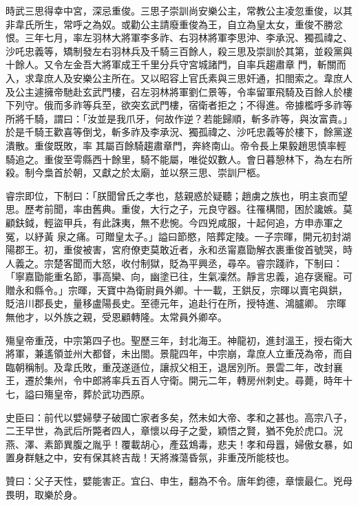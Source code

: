 \begin{pinyinscope}
 時武三思得幸中宮，深忌重俊。三思子崇訓尚安樂公主，常教公主凌忽重俊，以其非韋氏所生，常呼之為奴。或勸公主請廢重俊為王，自立為皇太女，重俊不勝忿恨。三年七月，率左羽林大將軍李多祚、右羽林將軍李思沖、李承況、獨孤禕之、沙吒忠義等，矯制發左右羽林兵及千騎三百餘人，殺三思及崇訓於其第，並殺黨與十餘人。又令左金吾大將軍成王千里分兵守宮城諸門，自率兵趨肅章
 門，斬關而入，求韋庶人及安樂公主所在。又以昭容上官氏素與三思奸通，扣閤索之。韋庶人及公主遽擁帝馳赴玄武門樓，召左羽林將軍劉仁景等，令率留軍飛騎及百餘人於樓下列守。俄而多祚等兵至，欲突玄武門樓，宿衛者拒之；不得進。帝據檻呼多祚等所將千騎，謂曰：「汝並是我爪牙，何故作逆？若能歸順，斬多祚等，與汝富貴。」於是千騎王歡喜等倒戈，斬多祚及李承況、獨孤禕之、沙吒忠義等於樓下，餘黨遂潰散。重俊既敗，率
 其屬百餘騎趨肅章門，奔終南山。帝令長上果毅趙思慎率輕騎追之。重俊至雩縣西十餘里，騎不能屬，唯從奴數人。會日暮憩林下，為左右所殺。制今梟首於朝，又獻之於太廟，並以祭三思、崇訓尸柩。



 睿宗即位，下制曰：「朕聞曾氏之孝也，慈親惑於疑聽；趙虜之族也，明主哀而望思。歷考前聞，率由舊典。重俊，大行之子，元良守器。往罹構間，困於讒嫉。莫顧鈇鉞，輕盜甲兵，有此誅夷，無不悲惋。今四兇咸服，十起何追，方申赤軍之冤，以紓黃
 泉之痛。可贈皇太子。」謚曰節愍，陪葬定陵。一子宗暉，開元初封湖陽郡王。初，重俊被害，宮府僚吏莫敢近者，永和丞甯嘉勖解衣裹重俊首號哭，時人義之。宗楚客聞而大怒，收付制獄，貶為平興丞，尋卒。睿宗踐祚，下制曰：「寧嘉勖能重名節，事高欒、向，幽塗已往，生氣凜然。靜言忠義，追存褒寵。可贈永和縣令。」宗暉，天寶中為衛尉員外卿。十一載，王鉷反，宗暉以賣宅與鉷，貶涪川郡長史，量移盧陽長史。至德元年，追赴行在所，授特進、鴻臚卿。
 宗暉無他才，以外族之親，受恩顧轉隆。太常員外卿卒。



 殤皇帝重茂，中宗第四子也。聖歷三年，封北海王。神龍初，進封溫王，授右衛大將軍，兼遙領並州大都督，未出閤。景龍四年，中宗崩，韋庶人立重茂為帝，而自臨朝稱制。及韋氏敗，重茂遂遜位，讓叔父相王，退居別所。景雲二年，改封襄王，遷於集州，令中郎將率兵五百人守衛。開元二年，轉房州刺史。尋薨，時年十七，謚曰殤皇帝，葬於武功西原。



 史臣曰：前代以嬖婦孽子破國亡家者多矣，然未如大帝、孝和之甚也。高宗八子，二王早世，為武后所斃者四人，章懷以母子之愛，穎悟之賢，猶不免於虎口。況燕、澤、素節異腹之胤乎！覆載胡心，產茲鴆毒，悲夫！孝和母囂，婦傲女暴，如置身群魅之中，安有保其終吉哉！天將滌蕩昏氛，非重茂所能枝也。



 贊曰：父子天性，嬖能害正。宜臼、申生，翻為不令。唐年鈞德，章懷最仁。兇母畏明，取樂於身。



\end{pinyinscope}